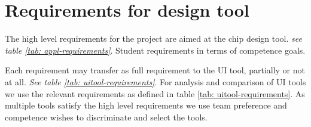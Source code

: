 \section{Requirements for design tool}

The high level requirements for the project are aimed at the chip design tool. {\em see table \ref{tab: appl-requirements}}.
Student requirements in terms of competence goals.

Each requirement may transfer as full requirement to the UI tool, partially or not at all. {\em See table \ref{tab: uitool-requirements}}.
For analysis and comparison of UI tools we use the relevant requirements as defined in table \ref{tab: uitool-requirements}.
As multiple tools satisfy the high level requirements we use team preference and competence wishes to discriminate and select the tools.


